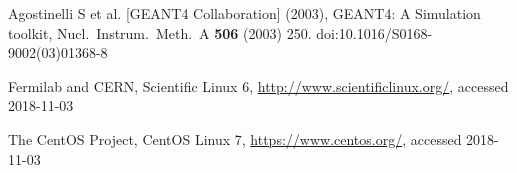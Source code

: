 \begin{thebibliography}{}
Agostinelli S  et al. [GEANT4 Collaboration] (2003),        
GEANT4: A Simulation toolkit,                          
Nucl.\ Instrum.\ Meth.\ A {\bf 506} (2003) 250.            
doi:10.1016/S0168-9002(03)01368-8                          


Fermilab and CERN,
Scientific Linux 6,
\url{http://www.scientificlinux.org/}, accessed 2018-11-03

The CentOS Project,
CentOS Linux 7,
\url{https://www.centos.org/}, accessed 2018-11-03


\end{thebibliography}



